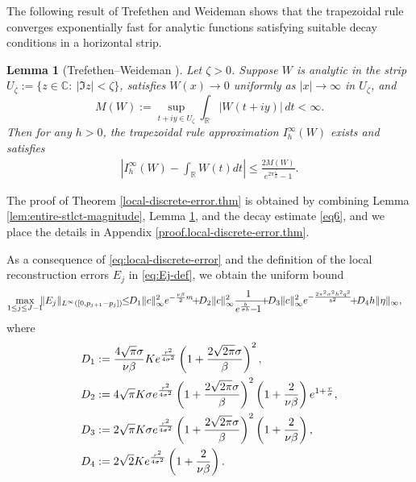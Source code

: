 \documentclass[11pt, reqno]{amsart}
\newtheorem{lemma}[theorem]{Lemma}%
\newcommand{\R}{\mathbb{R}}
\newcommand{\C}{\mathbb{C}}
\numberwithin{equation}{section}
\begin{document}
The following result of Trefethen and Weideman shows that the trapezoidal rule converges exponentially fast for analytic functions satisfying suitable decay conditions in a horizontal strip. 

\begin{lemma}[Trefethen--Weideman {\cite[Theorem 5.1]{trefethen2014exponentially}}]\label{lem:trapezoidal}
Let $\zeta>0$. Suppose $W$ is analytic in the strip
 $ U_\zeta:=\{z\in\C:\ |\Im z|<\zeta\}$, 
satisfies $W(x)\to 0$ uniformly as $|x|\to\infty$ in $U_\zeta$, and
$$ M(W):=\sup_{t+iy\in U_\zeta}\int_{\R}|W(t+iy)|\,dt<\infty.$$ 
Then for any $h > 0$, the trapezoidal rule approximation $I_h^{\infty} (W)$ exists and satisfies
	\begin{align*}
		| I_h^{\infty} (W) - \int_{\R} W(t)dt | \le \frac{2 M(W)}{e^{2 \pi \frac{\zeta}{h}} - 1}.
	\end{align*}
\end{lemma}

The proof of Theorem \ref{local-discrete-error.thm} is obtained by combining Lemma \ref{lem:entire-stlct-magnitude}, Lemma \ref{lem:trapezoidal}, and the decay estimate \eqref{eq6}, and we place the details in Appendix \ref{proof.local-discrete-error.thm}.


As a consequence of \eqref{eq:local-discrete-error} and the definition of the local reconstruction errors $E_j$ in \eqref{eq:Ej-def}, we obtain the uniform bound
\begin{align}\label{eq9}
\max_{1\le j\le J-1} \hskip-.06in \|E_j\|_{L^\infty([0,p_{j+1}-p_j])} & \hskip-.05in \le \hskip-.05in
D_1\|c\|_\infty^2 e^{-\frac{\nu\beta}{2}m} \hskip-.05in + \hskip-.05in D_2\|c\|_\infty^2\frac{1}{e^{\frac{b}{\sigma h}} \hskip-.05in - \hskip-.05in 1} \hskip-.05in + \hskip-.05in D_3\|c\|_\infty^2 e^{-\frac{2\pi^2\sigma^2 h^2 q^2}{b^2}}
\hskip-.06in + \hskip-.05in D_4 h\|\eta\|_\infty,
\end{align}
where
\begin{align}\label{eq8}
D_1:={}& \frac{4\sqrt{\pi}\sigma}{\nu\beta} K e^{\frac{r^2}{4\sigma^2}} \left(1+\frac{2\sqrt{2\pi}\sigma}{\beta}\right)^2,
\notag\\
D_2:={}& 4\sqrt{\pi}K\sigma e^{\frac{r^2}{4\sigma^2}} \left(1+\frac{2\sqrt{2\pi}\sigma}{\beta}\right)^2
\left(1+\frac{2}{\nu\beta}\right) e^{1+\frac{r}{\sigma}},
\notag\\
D_3:={}& 2\sqrt{\pi}K\sigma e^{\frac{r^2}{4\sigma^2}} \left(1+\frac{2\sqrt{2\pi}\sigma}{\beta}\right)^2
\left(1+\frac{2}{\nu\beta}\right),
\notag\\
D_4:={}& 2\sqrt{2}K e^{\frac{r^2}{4\sigma^2}} \left(1+\frac{2}{\nu\beta}\right).
\end{align}
\end{document}
